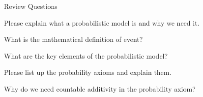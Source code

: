 \documentclass[fleqn,aspectratio=169]{beamer}
\begin{document}
\begin{frame}{Review Questions}
\bce[1)]
\item Please explain what a probabilistic model is and why we need it. 

\item What is the mathematical definition of event?

\item What are the key elements of the probabilistic model?

\item Please list up the probability axioms and explain them. 

\item Why do we need countable additivity in the probability axiom?

\ece
\end{frame}
\end{document}
